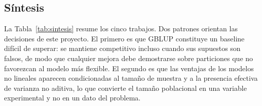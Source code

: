 \documentclass[conference]{IEEEtran}
\begin{document}
\subsection{Síntesis}

La Tabla~\ref{tab:sintesis} resume los cinco trabajos. Dos patrones
orientan las decisiones de este proyecto. El primero es que GBLUP
constituye un baseline difícil de superar: se mantiene competitivo incluso
cuando sus supuestos son falsos, de modo que cualquier mejora debe
demostrarse sobre particiones que no favorezcan al modelo más flexible. El
segundo es que las ventajas de los modelos no lineales aparecen
condicionadas al tamaño de muestra y a la presencia efectiva de varianza
no aditiva, lo que convierte el tamaño poblacional en una variable
experimental y no en un dato del problema.
\end{document}
